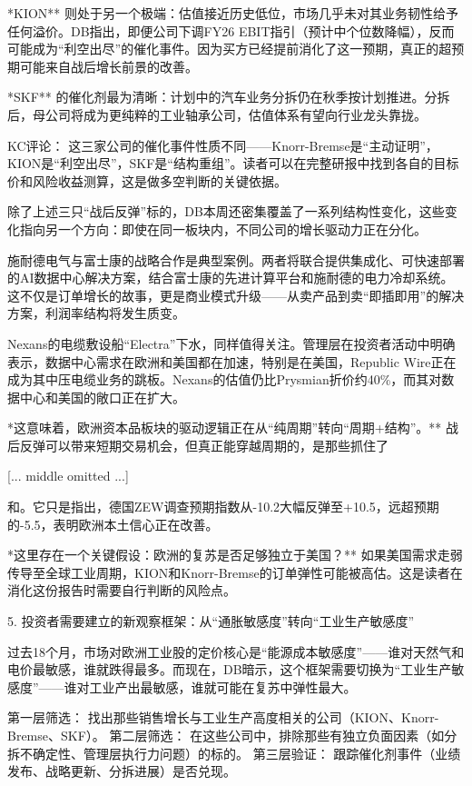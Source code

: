 \documentclass[11pt]{ctexart}
\begin{document}
*KION** 则处于另一个极端：估值接近历史低位，市场几乎未对其业务韧性给予任何溢价。DB指出，即便公司下调FY26 EBIT指引（预计中个位数降幅），反而可能成为“利空出尽”的催化事件。因为买方已经提前消化了这一预期，真正的超预期可能来自战后增长前景的改善。

*SKF** 的催化剂最为清晰：计划中的汽车业务分拆仍在秋季按计划推进。分拆后，母公司将成为更纯粹的工业轴承公司，估值体系有望向行业龙头靠拢。

KC评论： 这三家公司的催化事件性质不同——Knorr-Bremse是“主动证明”，KION是“利空出尽”，SKF是“结构重组”。读者可以在完整研报中找到各自的目标价和风险收益测算，这是做多空判断的关键依据。

除了上述三只“战后反弹”标的，DB本周还密集覆盖了一系列结构性变化，这些变化指向另一个方向：即使在同一板块内，不同公司的增长驱动力正在分化。

施耐德电气与富士康的战略合作是典型案例。两者将联合提供集成化、可快速部署的AI数据中心解决方案，结合富士康的先进计算平台和施耐德的电力冷却系统。这不仅是订单增长的故事，更是商业模式升级——从卖产品到卖“即插即用”的解决方案，利润率结构将发生质变。

Nexans的电缆敷设船“Electra”下水，同样值得关注。管理层在投资者活动中明确表示，数据中心需求在欧洲和美国都在加速，特别是在美国，Republic Wire正在成为其中压电缆业务的跳板。Nexans的估值仍比Prysmian折价约40\%，而其对数据中心和美国的敞口正在扩大。

*这意味着，欧洲资本品板块的驱动逻辑正在从“纯周期”转向“周期+结构”。** 战后反弹可以带来短期交易机会，但真正能穿越周期的，是那些抓住了

[... middle omitted ...]

和。它只是指出，德国ZEW调查预期指数从-10.2大幅反弹至+10.5，远超预期的-5.5，表明欧洲本土信心正在改善。

*这里存在一个关键假设：欧洲的复苏是否足够独立于美国？** 如果美国需求走弱传导至全球工业周期，KION和Knorr-Bremse的订单弹性可能被高估。这是读者在消化这份报告时需要自行判断的风险点。

5. 投资者需要建立的新观察框架：从“通胀敏感度”转向“工业生产敏感度”

过去18个月，市场对欧洲工业股的定价核心是“能源成本敏感度”——谁对天然气和电价最敏感，谁就跌得最多。而现在，DB暗示，这个框架需要切换为“工业生产敏感度”——谁对工业产出最敏感，谁就可能在复苏中弹性最大。

第一层筛选： 找出那些销售增长与工业生产高度相关的公司（KION、Knorr-Bremse、SKF）。 第二层筛选： 在这些公司中，排除那些有独立负面因素（如分拆不确定性、管理层执行力问题）的标的。 第三层验证： 跟踪催化剂事件（业绩发布、战略更新、分拆进展）是否兑现。
\end{document}
